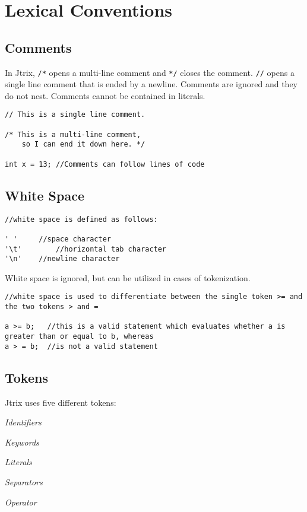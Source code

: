 \documentclass[12pt]{report}
\begin{document}
\tableofcontents

\chapter{Lexical Conventions}

\section{Comments}
In Jtrix, \texttt{/*} opens a multi-line comment and \texttt{*/} closes the comment. \texttt{//} opens a single line comment that is ended by a newline. Comments are ignored and they do not nest. Comments cannot be contained in literals.

\begin{lstlisting}
// This is a single line comment.

/* This is a multi-line comment,
	so I can end it down here. */

int x = 13; //Comments can follow lines of code
\end{lstlisting}

\section{White Space}
\begin{lstlisting}
//white space is defined as follows:

' '	    //space character
'\t'		//horizontal tab character
'\n'	//newline character
\end{lstlisting}
White space is ignored, but can be utilized in cases of tokenization.
\begin{lstlisting}
//white space is used to differentiate between the single token >= and the two tokens > and =

a >= b;   //this is a valid statement which evaluates whether a is greater than or equal to b, whereas
a > = b;  //is not a valid statement
\end{lstlisting}
\section{Tokens}
Jtrix uses five different tokens:

 \textit{Identifiers}

 \textit{Keywords}

 \textit{Literals}

 \textit{Separators}

 \textit{Operator}
\end{document}
